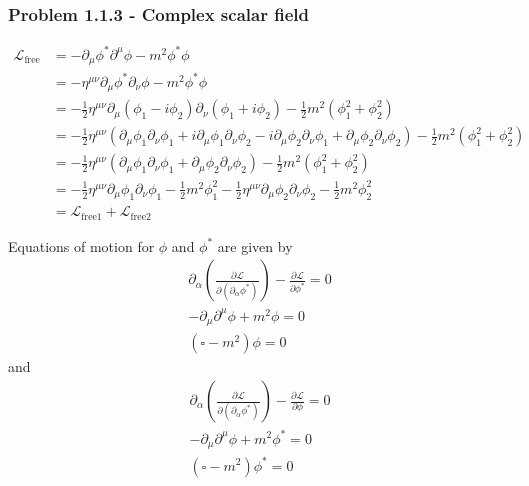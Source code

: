 \documentclass[10pt,a4paper]{book}
\theoremstyle{definition}
\begin{document}
\subsubsection{Problem 1.1.3 - Complex scalar field }
\begin{align}
    \mathcal{L}_\text{free}&=-\partial_\mu\phi^*\partial^\mu\phi-m^2\phi^*\phi\\
    &=-\eta^{\mu\nu}\partial_\mu\phi^*\partial_\nu\phi-m^2\phi^*\phi\\
    &=-\frac{1}{2}\eta^{\mu\nu}\partial_\mu(\phi_1-i\phi_2)\partial_\nu(\phi_1+i\phi_2)-\frac{1}{2}m^2(\phi_1^2+\phi_2^2)\\
    &=-\frac{1}{2}\eta^{\mu\nu}\left(
    \partial_\mu\phi_1\partial_\nu\phi_1
    +i\partial_\mu\phi_1\partial_\nu\phi_2
    -i\partial_\mu\phi_2\partial_\nu\phi_1
    +\partial_\mu\phi_2\partial_\nu\phi_2
    \right)-\frac{1}{2}m^2(\phi_1^2+\phi_2^2)\\
    &=-\frac{1}{2}\eta^{\mu\nu}\left(\partial_\mu\phi_1\partial_\nu\phi_1+\partial_\mu\phi_2\partial_\nu\phi_2\right)-\frac{1}{2}m^2(\phi_1^2+\phi_2^2)\\
    &=-\frac{1}{2}\eta^{\mu\nu}\partial_\mu\phi_1\partial_\nu\phi_1-\frac{1}{2}m^2\phi_1^2
    -\frac{1}{2}\eta^{\mu\nu}\partial_\mu\phi_2\partial_\nu\phi_2-\frac{1}{2}m^2\phi_2^2\\
    &=\mathcal{L}_\text{free1}+\mathcal{L}_\text{free2}
\end{align}

Equations of motion for $\phi$ and $\phi^*$ are given by
\begin{align}
    \partial_\alpha\left(\frac{\partial\mathcal{L}}{\partial(\partial_\alpha\phi^*)}\right)-\frac{\partial\mathcal{L}}{\partial\phi^*}=0\\
    -\partial_\mu\partial^\mu\phi+m^2\phi=0\\
    (\square-m^2)\phi=0
\end{align}
and
\begin{align}
    \partial_\alpha\left(\frac{\partial\mathcal{L}}{\partial(\partial_\alpha\phi^*)}\right)-\frac{\partial\mathcal{L}}{\partial\phi}=0\\
    -\partial_\mu\partial^\mu\phi+m^2\phi^*=0\\
    (\square-m^2)\phi^*=0
\end{align}
\end{document}
